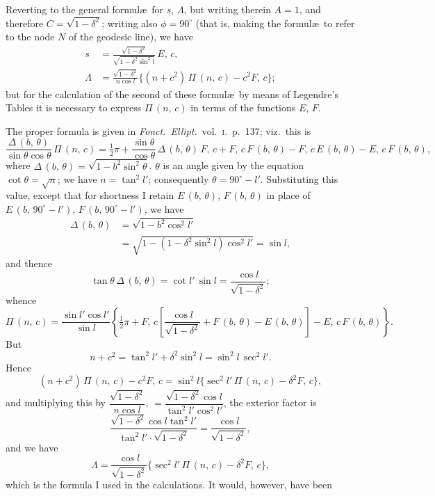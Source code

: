 \documentclass[11pt,a4paper]{article}
\begin{document}
Reverting to the general formul\ae\ for $s$, $\Lambda$, but writing therein
$A = 1$, and therefore $C = \sqrt{1 - \delta^2}$; writing also $\phi = 90^\circ$
(that is, making the formul\ae\ to refer to the node $N$ of the geodesic line),
we have
\begin{align*}
s &= \frac{\sqrt{1 - \delta^2}}{\sqrt{1 - \delta^2\sin^2 l}}\,E,\,c, \\
\Lambda &= \frac{\sqrt{1 - \delta^2}}{n\cos l}
\bigl\{(n + c^2)\,\Pi\,(n,\,c) - c^2 F,\,c\bigr\};
\end{align*}
but for the calculation of the second of these formul\ae\ by means of
Legendre's Tables it is necessary to express $\Pi\,(n,\,c)$ in terms of the
functions $E$, $F$.

The proper formula is given in \textit{Fonct.\ Ellipt.}\ vol.~\textsc{i}.\
p.~137; viz.\ this is
\[
\frac{\Delta\,(b,\,\theta)}{\sin\theta\cos\theta}\,\Pi\,(n,\,c)
= \tfrac{1}{2}\pi + \frac{\sin\theta}{\cos\theta}\,\Delta\,(b,\,\theta)\,F,\,c
+ F,\,c\,F\,(b,\,\theta) - F,\,c\,E\,(b,\,\theta) - E,\,c\,F\,(b,\,\theta),
\]
where $\Delta\,(b,\,\theta) = \sqrt{1 - b^2\sin^2\theta}$.  $\theta$ is an angle
given by the equation $\cot\theta = \sqrt{n}$; we have $n = \tan^2 l'$;
consequently $\theta = 90^\circ - l'$.  Substituting this value, except that
for shortness I retain $E\,(b,\,\theta)$, $F\,(b,\,\theta)$ in place of
$E\,(b,\,90^\circ - l')$, $F\,(b,\,90^\circ - l')$, we have
\begin{align*}
\Delta\,(b,\,\theta) &= \sqrt{1 - b^2\cos^2 l'} \\
&= \sqrt{1 - (1 - \delta^2\sin^2 l)\cos^2 l'} = \sin l,
\end{align*}
and thence
\[
\tan\theta\,\Delta\,(b,\,\theta) = \cot l'\,\sin l = \frac{\cos l}{\sqrt{1 - \delta^2}};
\]
whence
\[
\Pi\,(n,\,c) = \frac{\sin l'\cos l'}{\sin l}
\left\{\tfrac{1}{2}\pi + F,\,c\!\left[\frac{\cos l}{\sqrt{1 - \delta^2}}
+ F\,(b,\,\theta) - E\,(b,\,\theta)\right] - E,\,c\,F\,(b,\,\theta)\right\}.
\]
But
\[
n + c^2 = \tan^2 l' + \delta^2\sin^2 l = \sin^2 l\,\sec^2 l'.
\]
Hence
\[
(n + c^2)\,\Pi\,(n,\,c) - c^2 F,\,c
= \sin^2 l\bigl\{\sec^2 l'\,\Pi\,(n,\,c) - \delta^2 F,\,c\bigr\},
\]
and multiplying this by $\dfrac{\sqrt{1 - \delta^2}}{n\cos l}$,
$= \dfrac{\sqrt{1 - \delta^2}\cos l}{\tan^2 l'\cos^2 l'}$,
the exterior factor is
\[
\frac{\sqrt{1 - \delta^2}\cos l\tan^2 l'}{\tan^2 l'\cdot\sqrt{1 - \delta^2}}
= \frac{\cos l}{\sqrt{1 - \delta^2}},
\]
and we have
\[
\Lambda = \frac{\cos l}{\sqrt{1 - \delta^2}}
\bigl\{\sec^2 l'\,\Pi\,(n,\,c) - \delta^2 F,\,c\bigr\},
\]
which is the formula I used in the calculations.  It would, however, have been
\end{document}
